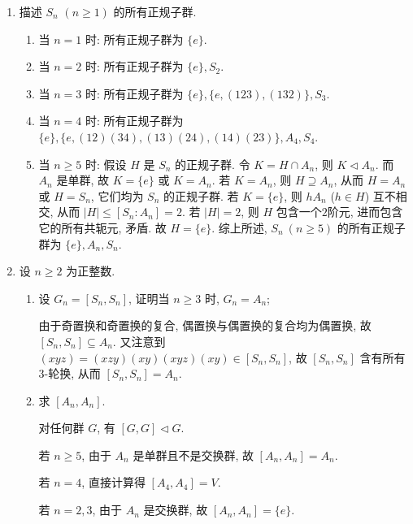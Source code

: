 \begin{enumerate}
\item 描述 $S_n$ $(n \geqslant 1)$ 的所有正规子群.
\begin{solution}
    \begin{enumerate}
        \item[(1)]
        当 $n=1$ 时:
        所有正规子群为 $\{e\}$.
        \item[(2)]
        当 $n=2$ 时:
        所有正规子群为 $\{e\},S_2$.
        \item[(3)]
        当 $n=3$ 时:
        所有正规子群为 $\{e\},\{e,(123),(132)\},S_3$. 
        \item[(4)]
        当 $n=4$ 时:
        所有正规子群为 $\{e\},\{e,(12)(34),(13)(24),(14)(23)\},A_4,S_4$.
        \item[(5)]
        当 $n\geqslant 5$ 时:
        假设 $H$ 是 $S_n$ 的正规子群.
        令 $K = H \cap A_n$,
        则 $K \triangleleft A_n$.
        而 $A_n$ 是单群,
        故 $K = \{e\}$ 或 $K = A_n$.
        若 $K = A_n$,
        则 $H \supseteq A_n$,
        从而 $H = A_n$ 或 $H = S_n$,
        它们均为 $S_n$ 的正规子群.
        若 $K=\{e\}$,
        则 $h A_n$ ($h\in H$) 互不相交,
        从而 $|H|\leqslant [S_n: A_n] = 2$.
        若 $|H|=2$, 则 $H$ 包含一个$2$阶元,
        进而包含它的所有共轭元, 矛盾.
        故 $H=\{e\}$. 
        综上所述, $S_n\ (n\geqslant 5)$ 的所有正规子群为
        $\{e\},A_n,S_n$.\qedhere
    \end{enumerate}
\end{solution}

\item 设 $n \geqslant 2$ 为正整数.
\begin{enumerate}[label=(\arabic*)]
\item 设 $G_n=\left[S_n, S_n\right]$, 证明当 $n \geqslant 3$ 时, $G_n=A_n$;
\begin{solution}
    由于奇置换和奇置换的复合, 偶置换与偶置换的复合均为偶置换,
    故 $[S_n,S_n]\subseteq A_n$.
    又注意到 $(xyz) = (xzy)(xy)(xyz)(xy) \in [S_n,S_n]$,
    故 $[S_n,S_n]$ 含有所有$3$-轮换,
    从而 $[S_n,S_n]=A_n$. 
\end{solution}
\item 求 $\left[A_n, A_n\right]$.
\begin{solution}
    对任何群 $G$,
    有 $[G,G]\triangleleft G$.

    若 $n\geqslant 5$, 由于 $A_n$ 是单群且不是交换群,
    故 $[A_n,A_n]=A_n$.

    若 $n=4$, 直接计算得 $[A_4,A_4]=V$.

    若 $n=2,3$, 由于 $A_n$ 是交换群, 故 $[A_n,A_n]=\{e\}$.
\end{solution}
\end{enumerate}


\end{enumerate}
